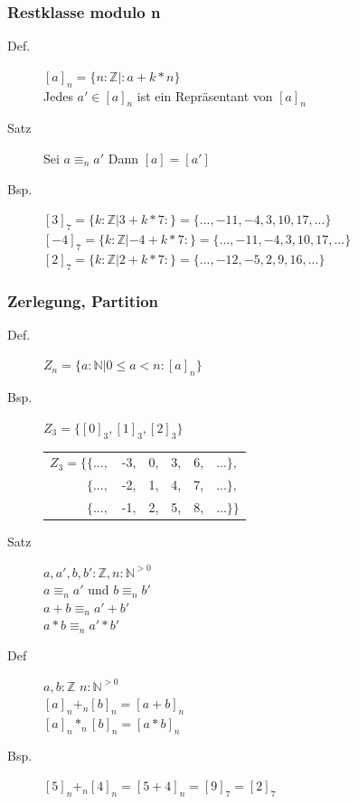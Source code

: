 \documentclass[a4paper,10pt]{article}
\newcommand{\NN}{\mathbb{N}} %
\newcommand{\ZN}{\mathbb{Z}} %
\begin{document}
\subsubsection{Restklasse modulo n}
\begin{description}
	\item[Def.] $[a]_n=\{n:\ZN|:a+k*n\}$ \\
		Jedes $a' \in [a]_n$ ist ein Repr\"asentant von $[a]_n$
	\item[Satz] Sei $a {\equiv}_n a'$ Dann $[a]=[a']$
	\item[Bsp.] $[3]_7 = \{k:\ZN|3+k*7:\} = \{ ..., -11, -4, 3, 10, 17, ...\}$ \\
		$[-4]_7 = \{k:\ZN|-4+k*7:\} = \{ ..., -11, -4, 3, 10, 17, ...\}$\\
		$[2]_7 = \{k:\ZN|2+k*7:\} = \{ ..., -12, -5, 2, 9, 16, ...\}$
\end{description}

\subsubsection{Zerlegung, Partition}
\begin{description}
	\item[Def.] $Z_n = \{a:\NN |0 \leq a < n : [a]_n \}$
	\item[Bsp.] $Z_3= \{[0]_3, [1]_3, [2]_3 \}$ \\
		\begin{tabular}{r c c c c l}
			$Z_3=\{\{ ...,$ & -3, & 0, & 3, & 6, & $...\},$ \\
			$\{ ...,$ & -2, & 1, & 4, & 7, & $...\},$ \\ 
			$\{ ...,$ & -1, & 2, & 5, & 8, & $...\}\}$ \\ 
		\end{tabular}
	\item[Satz] $a,a',b,b':\ZN, n:{\NN}^{>0}$ \\
		$a {\equiv}_n a'$ und $b {\equiv}_n b'$ \\
		$a + b {\equiv}_n a'+b'$ \\
		$a*b {\equiv}_n a' * b'$
	\item[Def] $a,b : \ZN$ $n:{\NN}^{>0}$ \\
		$[a]_n {+}_n [b]_n = [a+b]_n$ \\
		$[a]_n {*}_n [b]_n = [a*b]_n$
	\item[Bsp.] $[5]_n {+}_n [4]_n = [5+4]_n = [9]_7 = [2]_7$
\end{description}
\end{document}
